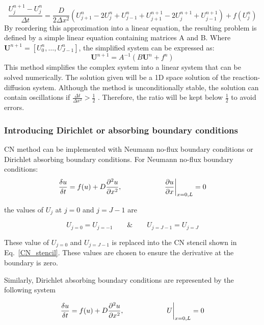 \begin{equation}
    \frac{U^{n+1}_{j} - U^{n}_{j}}{\Delta t} = \frac{D}{2\Delta x^{2}}\left( U^{n}_{j+1} -  2U^{n}_{j} + U^{n}_{j-1} + U^{n+1}_{j+1} - 2U^{n+1}_{j} + U^{n+1}_{j-1}\right) +  f( U^{n}_{j})
    \label{CN_stencil}
\end{equation}
By reordering this approximation into a linear equation, the resulting problem is defined by a simple linear equation containing matrices A and B. Where $\textbf{U}^{n+1} = [U^{n}_{0}, \ldots , U^{n}_{J-1}]$, the simplified system can be expressed as:
\begin{equation}
    \textbf{U}^{n+1} = A^{-1}(B\textbf{U}^{n} + f^{n})
\end{equation}
This method simplifies the complex system into a linear system that can be solved numerically. The solution given will be a 1D space solution of the reaction-diffusion system. Although the method is unconditionally stable, the solution can contain oscillations if $ \frac{\Delta t}{\Delta x^{2}} >\frac{1}{2} $ \parencite{trefethen1996finite}. Therefore, the ratio will be kept below $\frac{1}{2}$ to avoid errors.

\subsubsection{Introducing Dirichlet or absorbing boundary conditions}\label{methods_boundary_conditions_CN}
CN method can be implemented with Neumann no-flux boundary conditions or Dirichlet absorbing boundary conditions.
For Neumann no-flux boundary conditions:
\begin{equation}
    \frac{\delta u}{\delta t} =  f(u) + D\frac{\partial^{2} {u}}{\partial {x}^{2}},   \quad \quad \quad \quad \quad \quad \pdv{u}{x}\biggr\rvert_{x=0,L}=0
\end{equation}

the values of $U_{j}$ at $j=0$ and $j=J-1$ are

\begin{equation}
    U_{j=0} = U_{j=-1}  \quad \quad \&  \quad \quad  U_{j=J-1} = U_{j=J}
\end{equation}

These value of $U_{j=0}$ and  $U_{j=J-1}$ is replaced into the CN stencil shown in Eq.~\ref{CN_stencil}.
These values are chosen to ensure the derivative at the boundary is zero.

Similarly, Dirichlet absorbing boundary conditions are represented by the following system

\begin{equation}
    \frac{\delta u}{\delta t} =  f(u) + D\frac{\partial^{2} {u}}{\partial {x}^{2}},   \quad \quad \quad \quad \quad \quad U\biggr\rvert_{x=0,L}=0
\end{equation}

